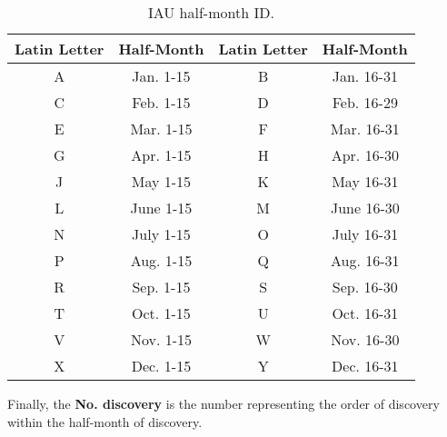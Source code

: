 \begin{table}[H]
    \centering
    \begin{tabular}{|c|c||c|c|}
        \hline
        \textbf{Latin Letter} & \textbf{Half-Month} & \textbf{Latin Letter} & \textbf{Half-Month} \\
        \hline
        A & Jan. 1-15 & B & Jan. 16-31 \\
        C & Feb. 1-15 & D & Feb. 16-29 \\
        E & Mar. 1-15 & F & Mar. 16-31 \\
        G & Apr. 1-15 & H & Apr. 16-30 \\
        J & May 1-15 & K & May 16-31 \\
        L & June 1-15 & M & June 16-30 \\
        N & July 1-15 & O & July 16-31 \\
        P & Aug. 1-15 & Q & Aug. 16-31 \\
        R & Sep. 1-15 & S & Sep. 16-30 \\
        T & Oct. 1-15 & U & Oct. 16-31 \\
        V & Nov. 1-15 & W & Nov. 16-30 \\
        X & Dec. 1-15 & Y & Dec. 16-31 \\
        \hline
    \end{tabular}
    \caption{IAU half-month ID.}
    \label{tab:iau_half_month_id}
\end{table}

Finally, the \textbf{No. discovery} is the number representing the order of
discovery within the half-month of discovery.
